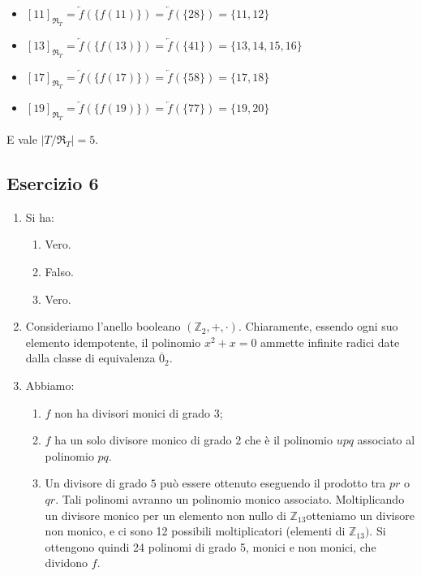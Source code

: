 \begin{enumerate}[label=(\textit{\roman*})]
\begin{itemize}
		\item $[11]_{\mathfrak{R}_{T}}=\overleftarrow{f}(\{f(11)\}) = \overleftarrow{f}(\{28\}) = \{11,12\}$
		\item $[13]_{\mathfrak{R}_{T}}=\overleftarrow{f}(\{f(13)\}) = \overleftarrow{f}(\{41\}) = \{13,14,15,16\}$
		\item $[17]_{\mathfrak{R}_{T}}=\overleftarrow{f}(\{f(17)\}) = \overleftarrow{f}(\{58\}) = \{17,18\}$
		\item $[19]_{\mathfrak{R}_{T}}=\overleftarrow{f}(\{f(19)\}) = \overleftarrow{f}(\{77\}) = \{19,20\}$
	\end{itemize}
	E vale $|T/{\mathfrak{R}_{T}}|=5$.
\end{enumerate}
\subsection*{Esercizio 6}
\begin{enumerate}[label=(\textit{\roman*})]
	\item Si ha:
	\begin{enumerate}[label=(\arabic*)]
		\item Vero.
		\item Falso.
		\item Vero.
	\end{enumerate}
	\item Consideriamo l'anello booleano $(\mathbb{Z}_{2},+,\cdot)$. Chiaramente, essendo ogni suo elemento idempotente, il polinomio $x^{2}+x=0$ ammette infinite radici date dalla classe di equivalenza $\overline{0}_{2}$.
	\item Abbiamo:
	\begin{enumerate}
		\item $f$ non ha divisori monici di grado 3;
		\item $f$ ha un solo divisore monico di grado 2 che è il polinomio $upq$ associato al polinomio $pq$.
		\item Un divisore di grado $5$ può essere ottenuto eseguendo il prodotto tra $pr$ o $qr$. Tali polinomi avranno un polinomio monico associato. Moltiplicando un divisore monico per un elemento non nullo di $\mathbb{Z}_{13}$​ otteniamo un divisore non monico, e ci sono 12 possibili moltiplicatori (elementi di $\mathbb{Z}_{13})$. Si ottengono quindi 24 polinomi di grado 5, monici e non monici, che dividono $f$.
	\end{enumerate}
\end{enumerate}
\vfill

